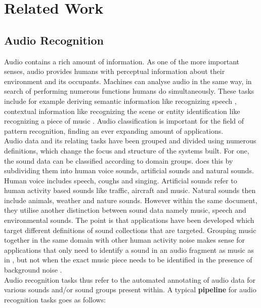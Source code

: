 \chapter{Related Work} \label{RelatedWork}

\section{Audio Recognition}

Audio contains a rich amount of information. As one of the more important senses, audio provides humans with perceptual information about their environment and its occupants. Machines can analyse audio in the same way, in search of performing numerous functions humans do simultaneously. These tasks include for example deriving semantic information like recognizing speech \citep{hannun2014deep}, contextual information like recognizing the scene \citep{abesser2020review} or entity identification like recognizing a piece of music \citep{huang2019state}. Audio classification is important for the field of pattern recognition, finding an ever expanding amount of applications. \\

Audio data and its relating tasks have been grouped and divided using numerous definitions, which change the focus and structure of the systems built. For one, the sound data can be classified according to domain groups. \cite{duan2014survey} does this by subdividing them into human voice sounds, artificial sounds and natural sounds. Human voice includes speech, coughs and singing. Artificial sounds refer to human activity based sounds like traffic, aircraft and music. Natural sounds then include animals, weather and nature sounds. However within the same document, they utilise another distinction between sound data namely music, speech and environmental sounds. The point is that applications have been developed which target different definitions of sound collections that are targeted. Grouping music together in the same domain with other human activity noise makes sense for applications that only need to identify a sound in an audio fragment as music as in \cite{park2020augmenting}, but not when the exact music piece needs to be identified in the presence of background noise \citep{huang2019state}.\\

Audio recognition tasks thus refer to the automated annotating of audio data for various sounds and/or sound groups present within. A typical \textbf{pipeline} for audio recognition tasks goes as follows: \\

